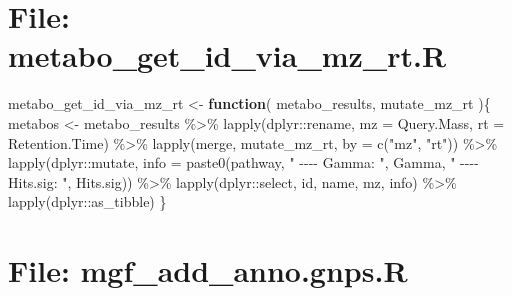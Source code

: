 \documentclass[
]{article}
\newenvironment{Shaded}{\begin{snugshade}}{\end{snugshade}}
\newcommand{\AttributeTok}[1]{\textcolor[rgb]{0.77,0.63,0.00}{#1}}
\newcommand{\ControlFlowTok}[1]{\textcolor[rgb]{0.13,0.29,0.53}{\textbf{#1}}}
\newcommand{\FunctionTok}[1]{\textcolor[rgb]{0.00,0.00,0.00}{#1}}
\newcommand{\NormalTok}[1]{#1}
\newcommand{\OtherTok}[1]{\textcolor[rgb]{0.56,0.35,0.01}{#1}}
\newcommand{\SpecialCharTok}[1]{\textcolor[rgb]{0.00,0.00,0.00}{#1}}
\newcommand{\StringTok}[1]{\textcolor[rgb]{0.31,0.60,0.02}{#1}}
\begin{document}
\hypertarget{file-metabo_get_id_via_mz_rt.r}{%
\section{File: metabo\_get\_id\_via\_mz\_rt.R}\label{file-metabo_get_id_via_mz_rt.r}}

\begin{Shaded}
\begin{Highlighting}[]
\NormalTok{metabo\_get\_id\_via\_mz\_rt }\OtherTok{\textless{}{-}} 
  \ControlFlowTok{function}\NormalTok{(}
\NormalTok{           metabo\_results,}
\NormalTok{           mutate\_mz\_rt}
\NormalTok{           )\{}
\NormalTok{    metabos }\OtherTok{\textless{}{-}}\NormalTok{ metabo\_results }\SpecialCharTok{\%\textgreater{}\%}
      \FunctionTok{lapply}\NormalTok{(dplyr}\SpecialCharTok{::}\NormalTok{rename, }\AttributeTok{mz =}\NormalTok{ Query.Mass, }\AttributeTok{rt =}\NormalTok{ Retention.Time) }\SpecialCharTok{\%\textgreater{}\%}
      \FunctionTok{lapply}\NormalTok{(merge, mutate\_mz\_rt, }\AttributeTok{by =} \FunctionTok{c}\NormalTok{(}\StringTok{"mz"}\NormalTok{, }\StringTok{"rt"}\NormalTok{)) }\SpecialCharTok{\%\textgreater{}\%}
      \FunctionTok{lapply}\NormalTok{(dplyr}\SpecialCharTok{::}\NormalTok{mutate,}
             \AttributeTok{info =} \FunctionTok{paste0}\NormalTok{(pathway,  }\StringTok{" {-}{-}{-}{-} Gamma: "}\NormalTok{, Gamma, }\StringTok{" {-}{-}{-}{-} Hits.sig: "}\NormalTok{, Hits.sig)) }\SpecialCharTok{\%\textgreater{}\%}
      \FunctionTok{lapply}\NormalTok{(dplyr}\SpecialCharTok{::}\NormalTok{select, id, name, mz, info) }\SpecialCharTok{\%\textgreater{}\%}
      \FunctionTok{lapply}\NormalTok{(dplyr}\SpecialCharTok{::}\NormalTok{as\_tibble)}
\NormalTok{  \}}
\end{Highlighting}
\end{Shaded}

\hypertarget{file-mgf_add_anno.gnps.r}{%
\section{File: mgf\_add\_anno.gnps.R}\label{file-mgf_add_anno.gnps.r}}
\end{document}
